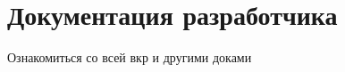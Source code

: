 \section{Документация разработчика}
\label{sec:developer}

Ознакомиться со всей вкр и другими доками
